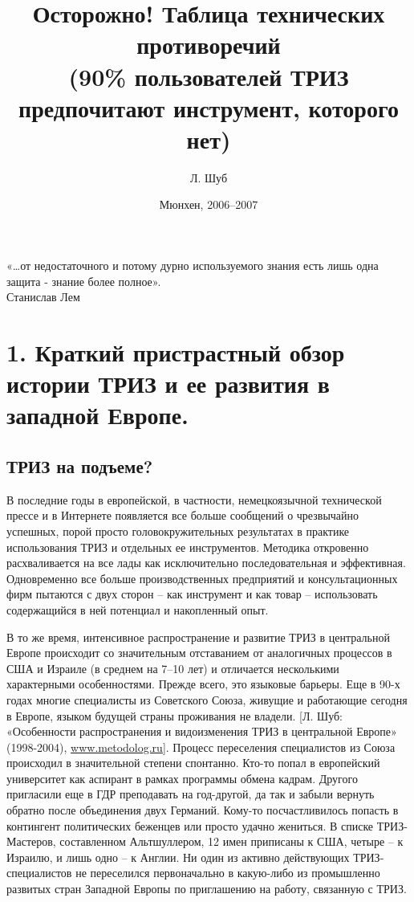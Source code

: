 \documentclass[11pt,a4paper]{article}
\title{Осторожно! Таблица технических противоречий\\ (90\% пользователей ТРИЗ
  предпочитают инструмент, которого нет)}
\author{Л. Шуб}
\date{Мюнхен, 2006--2007}
\begin{document}
\maketitle


\begin{flushright}
  «…от недостаточного и потому дурно используемого знания есть лишь одна
  защита - знание более полное».\\ Станислав Лем
\end{flushright}
\section*{1. Краткий пристрастный обзор истории ТРИЗ и ее развития в западной
  Европе.} 

\subsection*{ТРИЗ на подъеме?}

В последние годы в европейской, в частности, немецкоязычной технической прессе
и в Интернете появляется все больше сообщений о чрезвычайно успешных, порой
просто головокружительных результатах в практике использования ТРИЗ и
отдельных ее инструментов. Методика откровенно расхваливается на все лады как
исключительно последовательная и эффективная. Одновременно все больше
производственных предприятий и консультационных фирм пытаются с двух сторон --
как инструмент и как товар -- использовать содержащийся в ней потенциал и
накопленный опыт.

В то же время, интенсивное распространение и развитие ТРИЗ в центральной
Европе происходит со значительным отставанием от аналогичных процессов в США и
Израиле (в среднем на 7--10 лет) и отличается несколькими характерными
особенностями. Прежде всего, это языковые барьеры. Еще в 90-х годах многие
специалисты из Советского Союза, живущие и работающие сегодня в Европе, языком
будущей страны проживания не владели. [Л. Шуб: «Особенности распространения и
  видоизменения ТРИЗ в центральной Европе» (1998-2004),
  \url{www.metodolog.ru}]. Процесс переселения специалистов из Союза происходил в
значительной степени спонтанно. Кто-то попал в европейский университет как
аспирант в рамках программы обмена кадрам. Другого пригласили еще в ГДР
преподавать на год-другой, да так и забыли вернуть обратно после объединения
двух Германий. Кому-то посчастливилось попасть в контингент политических
беженцев или просто удачно жениться. В списке ТРИЗ-Мастеров, составленном
Альтшуллером, 12 имен приписаны к США, четыре -- к Израилю, и лишь одно -- к
Англии. Ни один из активно действующих ТРИЗ-специалистов не переселился
первоначально в какую-либо из промышленно развитых стран Западной Европы по
приглашению на работу, связанную с ТРИЗ.
\end{document}
